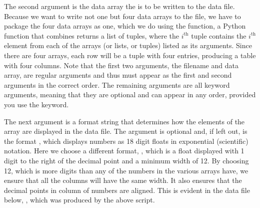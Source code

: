 \documentclass[letterpaper,10pt,english]{sphinxmanual}
\begin{document}
\sphinxAtStartPar
The second argument is the data array the is to be written to the data file.  Because we want to write not one but four data arrays to the file, we have to package the four data arrays as one, which we do using the  function, a Python function that combines returns a list of tuples, where the \(i^\mathrm{th}\) tuple contains the \(i^\mathrm{th}\) element from each of the arrays (or lists, or tuples) listed as its arguments.  Since there are four arrays, each row will be a tuple with four entries, producing a table with four columns.  Note that the first two arguments, the filename and data array, are regular arguments and thus must appear as the first and second arguments in the correct order.  The remaining arguments are all keyword arguments, meaning that they are optional and can appear in any order, provided you use the keyword.

\sphinxAtStartPar
The next argument is a format string that determines how the elements of the array are displayed in the data file.  The argument is optional and, if left out, is the format , which displays numbers as 18 digit floats in exponential (scientific) notation.  Here we choose a different format, , which is a float displayed with 1 digit to the right of the decimal point and a minimum width of 12.  By choosing 12, which is more digits than any of the numbers in the various arrays have, we ensure that all the columns will have the same width.  It also ensures that the decimal points in column of numbers are aligned.   This is evident in the data file below, , which was produced by the above script.

\begin{sphinxVerbatim}[commandchars=\\\{\},numbers=left,firstnumber=1,stepnumber=1]
                             
                             
                             
                             
                             
                             
                             
                             
                              
                              
                             
                             
                              
\end{sphinxVerbatim}
\end{document}
